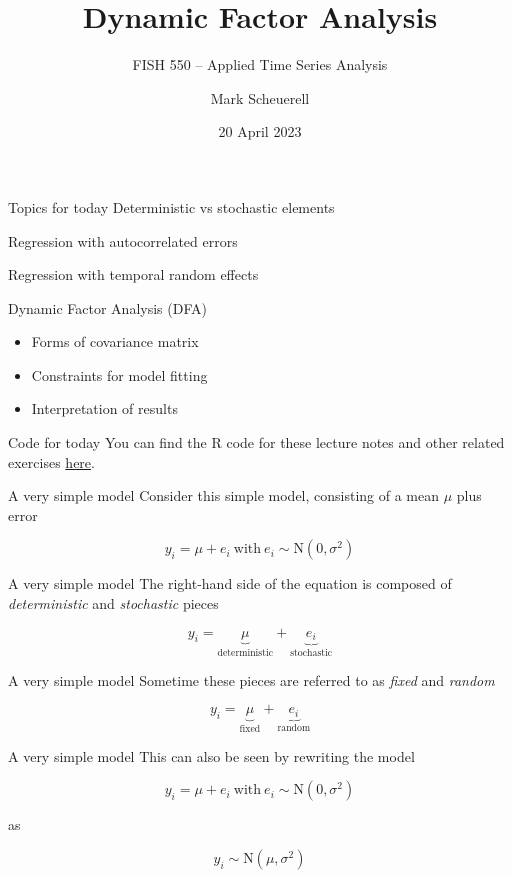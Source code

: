 \documentclass[
  ignorenonframetext,
]{beamer}
\title{Dynamic Factor Analysis}
\subtitle{FISH 550 -- Applied Time Series Analysis}
\author{Mark Scheuerell}
\date{20 April 2023}
\begin{document}
\frame{\titlepage}

\begin{frame}{Topics for today}
\protect\hypertarget{topics-for-today}{}
Deterministic vs stochastic elements

Regression with autocorrelated errors

Regression with temporal random effects

Dynamic Factor Analysis (DFA)

\begin{itemize}
\item
  Forms of covariance matrix
\item
  Constraints for model fitting
\item
  Interpretation of results
\end{itemize}
\end{frame}

\begin{frame}{Code for today}
\protect\hypertarget{code-for-today}{}
You can find the R code for these lecture notes and other related
exercises \href{lec_08_intro_to_DFA.R}{here}.
\end{frame}

\begin{frame}{A very simple model}
\protect\hypertarget{a-very-simple-model}{}
Consider this simple model, consisting of a mean \(\mu\) plus error

\[
y_i = \mu + e_i ~ \text{with} ~ e_i \sim \text{N}(0,\sigma^2)
\]
\end{frame}

\begin{frame}{A very simple model}
\protect\hypertarget{a-very-simple-model-1}{}
The right-hand side of the equation is composed of \emph{deterministic}
and \emph{stochastic} pieces

\[
y_i = \underbrace{\mu}_{\text{deterministic}} + \underbrace{e_i}_{\text{stochastic}}
\]
\end{frame}

\begin{frame}{A very simple model}
\protect\hypertarget{a-very-simple-model-2}{}
Sometime these pieces are referred to as \emph{fixed} and \emph{random}

\[
y_i = \underbrace{\mu}_{\text{fixed}} + \underbrace{e_i}_{\text{random}}
\]
\end{frame}

\begin{frame}{A very simple model}
\protect\hypertarget{a-very-simple-model-3}{}
This can also be seen by rewriting the model

\[
y_i = \mu + e_i ~ \text{with} ~ e_i \sim \text{N}(0,\sigma^2)
\]

as

\[
y_i \sim \text{N}(\mu,\sigma^2)
\]
\end{frame}
\end{document}

